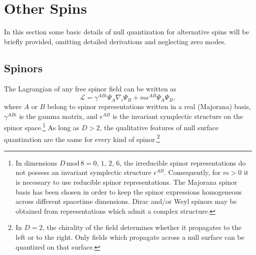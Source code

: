 \documentclass[12pt]{article}
\begin{document}
\section{Other Spins}\label{spin}

In this section some basic details of null quantization for alternative spins will be briefly provided, omitting detailed derivations and neglecting zero modes.

\subsection{Spinors}

The Lagrangian of any free spinor field can be written as
\begin{equation}\label{spinorL}
\mathcal{L} =  \gamma^{ABi} \Psi_A \nabla_i \Psi_B + m \epsilon^{AB} \Psi_A \Psi_B,
\end{equation}
where $A$ or $B$ belong to spinor representations written in a real (Majorana) basis, $\gamma^{ABi}$ is the gamma matrix, and $\epsilon^{AB}$ is the invariant symplectic structure on the spinor space.\footnote{In dimensions $D\,\mathrm{mod}\,8 = 0,\,1,\,2,\,6$, the irreducible spinor representations do not possess an invariant symplectic structure $\epsilon^{AB}$.  Consequently, for $m > 0$ it is necessary to use reducible spinor representations.  The Majorana spinor basis has been chosen in order to keep the spinor expressions homogeneous across different spacetime dimensions.  Dirac and/or Weyl spinors may be obtained from representations which admit a complex structure.} As long as $D > 2$, the qualitative features of null surface quantization are the same for every kind of spinor.\footnote{In $D = 2$, the chirality of the field determines whether it propagates to the left or to the right.  Only fields which propagate across a null surface can be quantized on that surface.}
\end{document}
